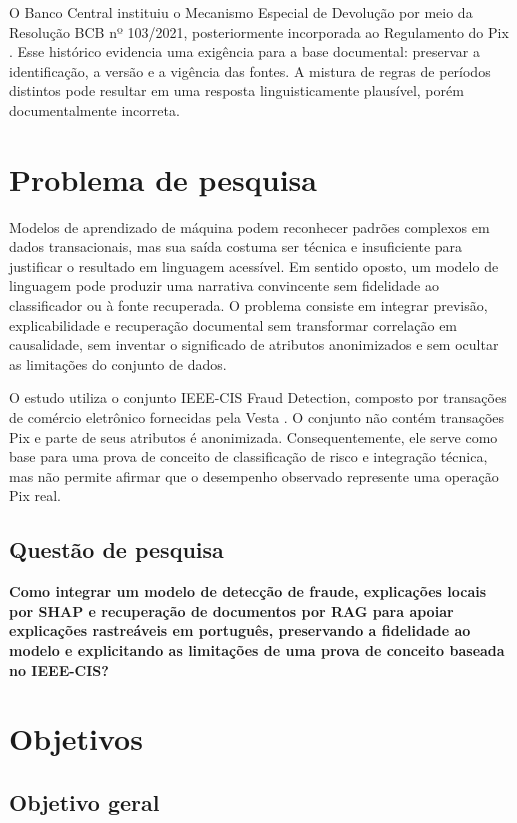 O Banco Central instituiu o Mecanismo Especial de Devolução por meio da Resolução BCB nº 103/2021, posteriormente incorporada ao Regulamento do Pix \cite{bcb_resolucao103_2021,bcb_resolucao1_2020}. Esse histórico evidencia uma exigência para a base documental: preservar a identificação, a versão e a vigência das fontes. A mistura de regras de períodos distintos pode resultar em uma resposta linguisticamente plausível, porém documentalmente incorreta.

\section{Problema de pesquisa}

Modelos de aprendizado de máquina podem reconhecer padrões complexos em dados transacionais, mas sua saída costuma ser técnica e insuficiente para justificar o resultado em linguagem acessível. Em sentido oposto, um modelo de linguagem pode produzir uma narrativa convincente sem fidelidade ao classificador ou à fonte recuperada. O problema consiste em integrar previsão, explicabilidade e recuperação documental sem transformar correlação em causalidade, sem inventar o significado de atributos anonimizados e sem ocultar as limitações do conjunto de dados.

O estudo utiliza o conjunto IEEE-CIS Fraud Detection, composto por transações de comércio eletrônico fornecidas pela Vesta \cite{ieee_cis_2019}. O conjunto não contém transações Pix e parte de seus atributos é anonimizada. Consequentemente, ele serve como base para uma prova de conceito de classificação de risco e integração técnica, mas não permite afirmar que o desempenho observado represente uma operação Pix real.

\subsection{Questão de pesquisa}

\textbf{Como integrar um modelo de detecção de fraude, explicações locais por SHAP e recuperação de documentos por RAG para apoiar explicações rastreáveis em português, preservando a fidelidade ao modelo e explicitando as limitações de uma prova de conceito baseada no IEEE-CIS?}

\section{Objetivos}

\subsection{Objetivo geral}

